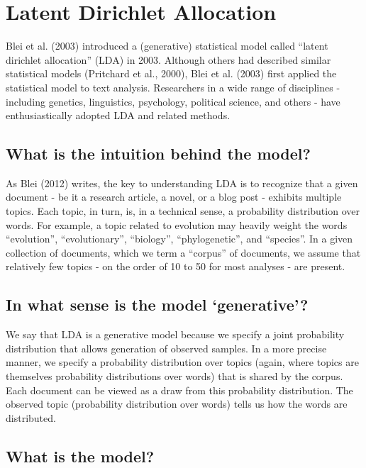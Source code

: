 \documentclass[12pt,]{article}
\begin{document}
\section{Latent Dirichlet Allocation}\label{latent-dirichlet-allocation}

Blei et al. (2003) introduced a (generative) statistical model called
``latent dirichlet allocation'' (LDA) in 2003. Although others had
described similar statistical models (Pritchard et al., 2000), Blei et
al. (2003) first applied the statistical model to text analysis.
Researchers in a wide range of disciplines - including genetics,
linguistics, psychology, political science, and others - have
enthusiastically adopted LDA and related methods.

\subsection{What is the intuition behind the
model?}\label{what-is-the-intuition-behind-the-model}

As Blei (2012) writes, the key to understanding LDA is to recognize that
a given document - be it a research article, a novel, or a blog post -
exhibits multiple topics. Each topic, in turn, is, in a technical sense,
a probability distribution over words. For example, a topic related to
evolution may heavily weight the words ``evolution'', ``evolutionary'',
``biology'', ``phylogenetic'', and ``species''. In a given collection of
documents, which we term a ``corpus'' of documents, we assume that
relatively few topics - on the order of 10 to 50 for most analyses - are
present.

\subsection{\texorpdfstring{In what sense is the model
`generative'?}{In what sense is the model generative?}}\label{in-what-sense-is-the-model-generative}

We say that LDA is a generative model because we specify a joint
probability distribution that allows generation of observed samples. In
a more precise manner, we specify a probability distribution over topics
(again, where topics are themselves probability distributions over
words) that is shared by the corpus. Each document can be viewed as a
draw from this probability distribution. The observed topic (probability
distribution over words) tells us how the words are distributed.

\subsection{What is the model?}\label{what-is-the-model}
\end{document}
